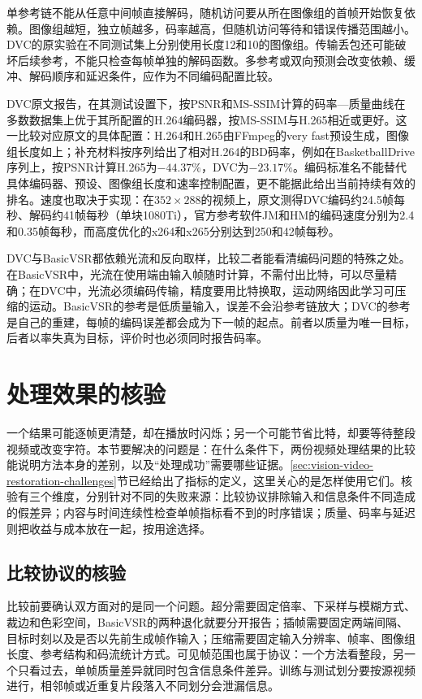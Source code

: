 单参考链不能从任意中间帧直接解码，随机访问要从所在图像组的首帧开始恢复依赖。图像组越短，独立帧越多，码率越高，但随机访问等待和错误传播范围越小。DVC的原实验在不同测试集上分别使用长度12和10的图像组。传输丢包还可能破坏后续参考，不能只检查每帧单独的解码函数。多参考或双向预测会改变依赖、缓冲、解码顺序和延迟条件，应作为不同编码配置比较。

DVC原文报告，在其测试设置下，按PSNR和MS-SSIM计算的码率—质量曲线在多数数据集上优于其所配置的H.264编码器，按MS-SSIM与H.265相近或更好。这一比较对应原文的具体配置：H.264和H.265由FFmpeg的very fast预设生成，图像组长度如上；补充材料按序列给出了相对H.264的BD码率，例如在BasketballDrive序列上，按PSNR计算H.265为$-44.37\%$，DVC为$-23.17\%$。编码标准名不能替代具体编码器、预设、图像组长度和速率控制配置，更不能据此给出当前持续有效的排名。速度也取决于实现：在$352\times288$的视频上，原文测得DVC编码约24.5帧每秒、解码约41帧每秒（单块1080Ti），官方参考软件JM和HM的编码速度分别为2.4和0.35帧每秒，而高度优化的x264和x265分别达到250和42帧每秒。

DVC与BasicVSR都依赖光流和反向取样，比较二者能看清编码问题的特殊之处。在BasicVSR中，光流在使用端由输入帧随时计算，不需付出比特，可以尽量精确；在DVC中，光流必须编码传输，精度要用比特换取，运动网络因此学习可压缩的运动。BasicVSR的参考是低质量输入，误差不会沿参考链放大；DVC的参考是自己的重建，每帧的编码误差都会成为下一帧的起点。前者以质量为唯一目标，后者以率失真为目标，评价时也必须同时报告码率。

\section{处理效果的核验}
\label{sec:vision-video-restoration-evaluation}

一个结果可能逐帧更清楚，却在播放时闪烁；另一个可能节省比特，却要等待整段视频或改变字符。本节要解决的问题是：在什么条件下，两份视频处理结果的比较能说明方法本身的差别，以及“处理成功”需要哪些证据。\ref{sec:vision-video-restoration-challenges}节已经给出了指标的定义，这里关心的是怎样使用它们。核验有三个维度，分别针对不同的失败来源：比较协议排除输入和信息条件不同造成的假差异；内容与时间连续性检查单帧指标看不到的时序错误；质量、码率与延迟则把收益与成本放在一起，按用途选择。

\subsection{比较协议的核验}
\label{sec:vision-video-restoration-protocol}

比较前要确认双方面对的是同一个问题。超分需要固定倍率、下采样与模糊方式、裁边和色彩空间，BasicVSR的两种退化就要分开报告；插帧需要固定两端间隔、目标时刻以及是否以先前生成帧作输入；压缩需要固定输入分辨率、帧率、图像组长度、参考结构和码流统计方式。可见帧范围也属于协议：一个方法看整段，另一个只看过去，单帧质量差异就同时包含信息条件差异。训练与测试划分要按源视频进行，相邻帧或近重复片段落入不同划分会泄漏信息。


